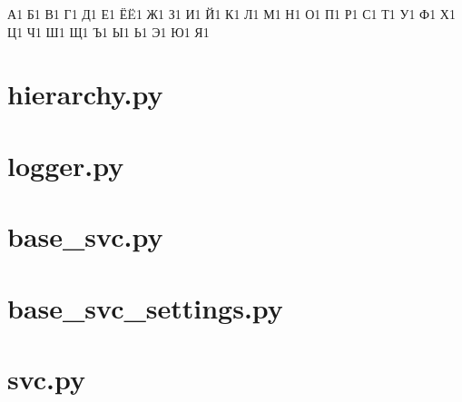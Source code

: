 \documentclass[a4paper,8pt]{article}
\begin{document}
{           {А}{{\selectfont{}}}1
           {Б}{{\selectfont{}}}1
           {В}{{\selectfont{}}}1
           {Г}{{\selectfont{}}}1
           {Д}{{\selectfont{}}}1
           {Е}{{\selectfont{}}}1
           {Ё}{{\"E}}1
           {Ж}{{\selectfont{}}}1
           {З}{{\selectfont{}}}1
           {И}{{\selectfont{}}}1
           {Й}{{\selectfont{}}}1
           {К}{{\selectfont{}}}1
           {Л}{{\selectfont{}}}1
           {М}{{\selectfont{}}}1
           {Н}{{\selectfont{}}}1
           {О}{{\selectfont{}}}1
           {П}{{\selectfont{}}}1
           {Р}{{\selectfont{}}}1
           {С}{{\selectfont{}}}1
           {Т}{{\selectfont{}}}1
           {У}{{\selectfont{}}}1
           {Ф}{{\selectfont{}}}1
           {Х}{{\selectfont{}}}1
           {Ц}{{\selectfont{}}}1
           {Ч}{{\selectfont{}}}1
           {Ш}{{\selectfont{}}}1
           {Щ}{{\selectfont{}}}1
           {Ъ}{{\selectfont{}}}1
           {Ы}{{\selectfont{}}}1
           {Ь}{{\selectfont{}}}1
           {Э}{{\selectfont{}}}1
           {Ю}{{\selectfont{}}}1
           {Я}{{\selectfont{}}}1
}

\section{hierarchy.py}


\section{logger.py}


\section{base\_svc.py}


\section{base\_svc\_settings.py}


\section{svc.py}

\end{document}
